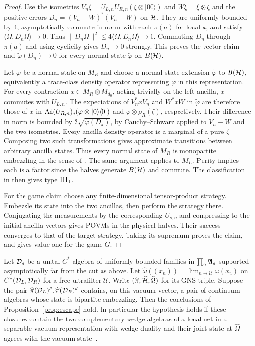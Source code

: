 \begin{proof}
Use the isometries $V_n\xi=U_{L,n}U_{R,n}(\xi\otimes|00\rangle)$ and
$W\xi=\xi\otimes\zeta$ and the positive errors
$D_n=(V_n-W)^*(V_n-W)$ on $\mathcal H$. They are uniformly bounded by $4$,
asymptotically commute in norm with each $\pi(a)$ for local $a$, and satisfy
$\langle\Omega,D_n\Omega\rangle\to0$. Thus
$\|D_n\Omega\|^2\leq4\langle\Omega,D_n\Omega\rangle\to0$. Commuting $D_n$
through $\pi(a)$ and using cyclicity gives $D_n\to0$ strongly. This proves
the vector claim and $\widetilde\varphi(D_n)\to0$ for every normal state
$\widetilde\varphi$ on $B(\mathcal H)$.

Let $\varphi$ be a normal state on $M_R$ and choose a normal state extension
$\widetilde\varphi$ to $B(\mathcal H)$, equivalently a trace-class density operator
representing $\varphi$ in this representation. For every contraction
$x\in M_R\overline\otimes M_{d_0}$, acting trivially on the left ancilla,
$x$ commutes with $U_{L,n}$. The expectations of $V_n^*xV_n$ and $W^*xW$
in $\widetilde\varphi$ are therefore those of $x$ in
$\operatorname{Ad}(U_{R,n})_*(\varphi\otimes|0\rangle\langle0|)$ and
$\varphi\otimes\rho_R(\zeta)$, respectively. Their difference in norm is
bounded by $2\sqrt{\widetilde\varphi(D_n)}$, by Cauchy--Schwarz applied to
$V_n-W$ and the two isometries. Every ancilla density operator is a marginal
of a pure $\zeta$. Composing two such transformations gives approximate
transitions between arbitrary ancilla states. Thus every normal state of $M_R$
is monopartite embezzling in the sense of \cite[Theorem E]{vLSWW24}. The same
argument applies to $M_L$. Purity implies each is a factor since the halves
generate $B(\mathcal H)$ and commute. The classification in \cite[Theorem E]{vLSWW24}
then gives type $\mathrm{III}_1$.

For the game claim choose any finite-dimensional tensor-product strategy.
Embezzle its state into the two ancillas, then perform the strategy there.
Conjugating the measurements by the corresponding $U_{s,n}$ and compressing
to the initial ancilla vectors gives POVMs in the physical halves. Their
success converges to that of the target strategy. Taking its supremum proves
the claim, and gives value one for the game $G$.
\end{proof}

\begin{theorem}\label{thm:scaling}
Let $\mathcal D_s$ be a unital $C^*$-algebra of uniformly bounded families in
$\prod_n\mathfrak A_s$ supported asymptotically far from the cut as above. Let
$\widehat\omega((x_n))=\lim_{n\to\mathcal U}\omega(x_n)$ on
$C^*(\mathcal D_L,\mathcal D_R)$ for a free ultrafilter $\mathcal U$. Write
$(\widehat\pi,\widehat{\mathcal H},\widehat\Omega)$ for its GNS triple. Suppose
the pair $\widehat\pi(\mathcal D_L)'',\widehat\pi(\mathcal D_R)''$ contains, on this vacuum
vector, a pair of continuum algebras whose state is bipartite embezzling.
Then the conclusions of Proposition~\ref{prop:escape} hold. In particular
the hypothesis holds if these closures contain the two complementary wedge
algebras of a local net in a separable vacuum representation with wedge duality
and their joint state at $\widehat\Omega$ agrees with the vacuum
state~\cite[Theorem~97]{vLSWW24}.
\end{theorem}

